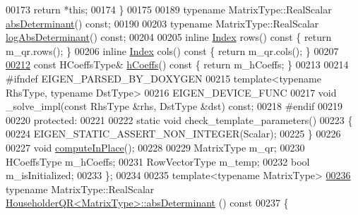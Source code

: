 \begin{DoxyCode}
00173       \textcolor{keywordflow}{return} *\textcolor{keyword}{this};
00174     \}
00175 
00189     \textcolor{keyword}{typename} MatrixType::RealScalar \hyperlink{group___q_r___module_aaf4ef26c0b7affc91431ec59c92d64c3}{absDeterminant}() \textcolor{keyword}{const};
00190 
00203     \textcolor{keyword}{typename} MatrixType::RealScalar \hyperlink{group___q_r___module_af61b6dbef34fc51c825182b16dc43ca1}{logAbsDeterminant}() \textcolor{keyword}{const};
00204 
00205     \textcolor{keyword}{inline} \hyperlink{namespace_eigen_a62e77e0933482dafde8fe197d9a2cfde}{Index} rows()\textcolor{keyword}{ const }\{ \textcolor{keywordflow}{return} m\_qr.rows(); \}
00206     \textcolor{keyword}{inline} \hyperlink{namespace_eigen_a62e77e0933482dafde8fe197d9a2cfde}{Index} cols()\textcolor{keyword}{ const }\{ \textcolor{keywordflow}{return} m\_qr.cols(); \}
00207     
\hyperlink{group___q_r___module_ae931aa44cde62317b57a9ae661d184be}{00212}     \textcolor{keyword}{const} HCoeffsType& \hyperlink{group___q_r___module_ae931aa44cde62317b57a9ae661d184be}{hCoeffs}()\textcolor{keyword}{ const }\{ \textcolor{keywordflow}{return} m\_hCoeffs; \}
00213     
00214 \textcolor{preprocessor}{    #ifndef EIGEN\_PARSED\_BY\_DOXYGEN}
00215     \textcolor{keyword}{template}<\textcolor{keyword}{typename} RhsType, \textcolor{keyword}{typename} DstType>
00216     EIGEN\_DEVICE\_FUNC
00217     \textcolor{keywordtype}{void} \_solve\_impl(\textcolor{keyword}{const} RhsType &rhs, DstType &dst) \textcolor{keyword}{const};
00218 \textcolor{preprocessor}{    #endif}
00219 
00220   \textcolor{keyword}{protected}:
00221     
00222     \textcolor{keyword}{static} \textcolor{keywordtype}{void} check\_template\_parameters()
00223     \{
00224       EIGEN\_STATIC\_ASSERT\_NON\_INTEGER(Scalar);
00225     \}
00226 
00227     \textcolor{keywordtype}{void} \hyperlink{group___q_r___module_a3a16530338a734971fc45efb0ef9ac94}{computeInPlace}();
00228     
00229     MatrixType m\_qr;
00230     HCoeffsType m\_hCoeffs;
00231     RowVectorType m\_temp;
00232     \textcolor{keywordtype}{bool} m\_isInitialized;
00233 \};
00234 
00235 \textcolor{keyword}{template}<\textcolor{keyword}{typename} MatrixType>
\hyperlink{group___q_r___module_aaf4ef26c0b7affc91431ec59c92d64c3}{00236} \textcolor{keyword}{typename} MatrixType::RealScalar \hyperlink{group___q_r___module_aaf4ef26c0b7affc91431ec59c92d64c3}{HouseholderQR<MatrixType>::absDeterminant}
      ()\textcolor{keyword}{ const}
00237 \textcolor{keyword}{}\{

\end{DoxyCode}
